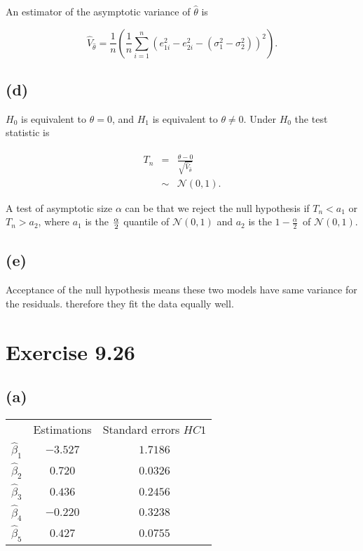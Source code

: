 \documentclass{article}
\begin{document}
An estimator of the asymptotic variance of $\hat{\theta}$ is

\begin{equation*}
\hat{V}_{\hat{\theta}}=\frac{1}{n}\left( \frac{1}{n}\sum_{i=1}^{n}\left(
e_{1i}^{2}-e_{2i}^{2}-\left( \sigma _{1}^{2}-\sigma _{2}^{2}\right) \right)
^{2}\right) .
\end{equation*}

\subsection*{(d)}

$H_{0}$ is equivalent to $\theta =0$, and $H_{1}$ is equivalent to $\theta
\neq 0.$ Under $H_{0}$ the test statistic is

\begin{eqnarray*}
T_{n} &=&\frac{\hat{\theta}-0}{\sqrt{\hat{V}_{\hat{\theta}}}} \\
&\sim &\mathcal{N}\left( 0,1\right) .
\end{eqnarray*}

A test of asymptotic size $\alpha $ can be that we reject the null
hypothesis if $T_{n}<a_{1}$ or $T_{n}>a_{2}$, where $a_{1}$ is the $\frac{%
\alpha }{2}$ quantile of $\mathcal{N}\left( 0,1\right) $ and $a_{2}$ is the $%
1-\frac{\alpha }{2}$\ of $\mathcal{N}\left( 0,1\right) .$

\subsection*{(e)}

Acceptance of the null hypothesis means these two models have same variance
for the residuals. therefore they fit the data equally well.

\section*{Exercise 9.26}

\subsection*{(a)}

\begin{center}
\begin{tabular}{ccc}
\hline\hline
& Estimations & Standard errors $HC1$ \\ \cline{2-3}
$\hat{\beta}_{1}$ & $-3.527$ & $1.7186$ \\ 
$\hat{\beta}_{2}$ & $0.720$ & $0.0326$ \\ 
$\hat{\beta}_{3}$ & $0.436$ & $0.2456$ \\ 
$\hat{\beta}_{4}$ & $-0.220$ & $0.3238$ \\ 
$\hat{\beta}_{5}$ & $0.427$ & $0.0755$ \\ \hline\hline
\end{tabular}
\end{center}
\end{document}
